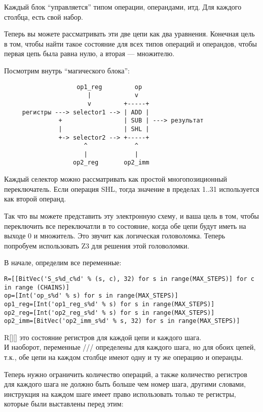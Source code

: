 Каждый блок ``управляется'' типом операции, операндами, итд.
Для каждого столбца, есть свой набор.

Теперь вы можете рассматривать эти две цепи как два уравнения.
Конечная цель в том, чтобы найти такое состояние для всех типов операций и операндов, чтобы первая цепь
была равна нулю, а вторая --- множителю.

Посмотрим внутрь ``магического блока'':

\begin{lstlisting}
	                op1_reg         op
	                   |            v
	                   v         +-----+
	 регистры ---> selector1 --> | ADD |
	           +                 | SUB | ---> результат
	           |                 | SHL |
	           +-> selector2 --> +-----+
	                  ^             ^
	                  |             |
	               op2_reg       op2_imm
\end{lstlisting}

Каждый селектор можно рассматривать как простой многопозиционный переключатель.
Если операция SHL, тогда значение в пределах 1..31 используется как второй операнд.

Так что вы можете представить эту электронную схему, и ваша цель в том, чтобы переключить все переключатли в то состояние,
когда обе цепи будут иметь на выходе 0 и множитель.
Это звучит как логическая головоломка.
Теперь попробуем использовать Z3 для решения этой головоломки.

В начале, определим все переменные:

\begin{lstlisting}
R=[[BitVec('S_s%d_c%d' % (s, c), 32) for s in range(MAX_STEPS)] for c in range (CHAINS)]
op=[Int('op_s%d' % s) for s in range(MAX_STEPS)]
op1_reg=[Int('op1_reg_s%d' % s) for s in range(MAX_STEPS)]
op2_reg=[Int('op2_reg_s%d' % s) for s in range(MAX_STEPS)]
op2_imm=[BitVec('op2_imm_s%d' % s, 32) for s in range(MAX_STEPS)]
\end{lstlisting}

R[][] это состояние регистров для каждой цепи и каждого шага.\\
И наоборот, переменные /// определены для каждого шага, но для обоих цепей,
т.к., обе цепи на каждом столбце имеют одну и ту же операцию и операнды.

Теперь нужно ограничить количество операций, а также количество регистров для каждого шага не должно быть больше чем
номер шага, другими словами, инструкция на каждом шаге имеет право использовать только те регистры, которые были
выставлены перед этим:

